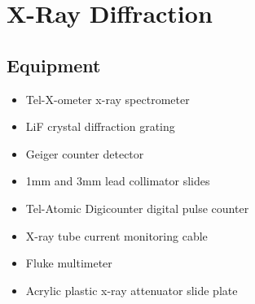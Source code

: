 




\chapter{X-Ray Diffraction}

\section{Equipment}

\begin{minipage}[t]{0.5\textwidth}
\begin{itemize}[noitemsep]
\item Tel-X-ometer x-ray spectrometer
\item LiF crystal diffraction grating
\item Geiger counter detector
\item 1mm and 3mm lead collimator slides
\end{itemize}
\end{minipage}
\begin{minipage}[t]{0.5\textwidth}
\begin{itemize}[noitemsep]
\item Tel-Atomic Digicounter digital pulse counter
\item X-ray tube current monitoring cable
\item Fluke multimeter
\item Acrylic plastic x-ray attenuator slide plate
\end{itemize}
\end{minipage}

